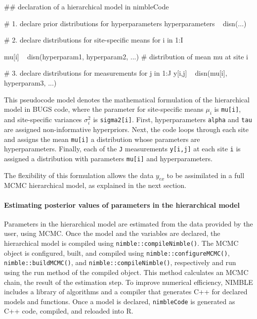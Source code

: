 \begin{example}
## declaration of a hierarchical model in nimbleCode

# 1. declare prior distributions for hyperparameters
hyperparameters ~ disn(...)

# 2. declare distributions for site-specific means
for i in 1:I {
  mu[i] ~ disn(hyperparam1, hyperparam2, ...) # distribution of mean mu at site i
  
# 3. declare distributions for measurements
  for j in 1:J {
  y[i,j] ~ disn(mu[i], hyperparam3, ...)
  }
}
\end{example}

%

This pseudocode model denotes the mathematical formulation of the hierarchical model in BUGS code, where the parameter for site-specific means $\mu_i$ is \texttt{mu[i]}, and site-specific variances $\sigma^2_{i}$ is \texttt{sigma2[i]}. 
First, hyperparameters \texttt{alpha} and \texttt{tau} are assigned non-informative hyperpriors. 
Next, the code loops through each site and assigns the mean \texttt{mu[i]} a distribution whose parameters are hyperparameters. 
Finally, each of the \texttt{J} measurements \texttt{y[i,j]} at each site \texttt{i} is assigned a distribution with parameters \texttt{mu[i]} and hyperparameters. 

The flexibility of this formulation allows the data $y_{ex}$ to be assimilated in a full MCMC hierarchical model, as explained in the next section.


\paragraph{Estimating posterior values of parameters in the hierarchical model}

Parameters in the hierarchical model are estimated from the data provided by the user, using MCMC. 
Once the model and the variables are declared, the hierarchical model is compiled using \texttt{nimble::compileNimble()}. 
The MCMC object is configured, built, and compiled using \texttt{nimble::configureMCMC()}, \texttt{nimble::buildMCMC()}, and \texttt{nimble::compileNimble()}, respectively and run using the run method of the compiled object. 
This method calculates an MCMC chain, the result of the estimation step. 
To improve numerical efficiency, NIMBLE includes a library of algorithms and a compiler that generates C++ for declared models and functions. 
Once a model is declared, \texttt{nimbleCode} is generated as C++ code, compiled, and reloaded into R.

